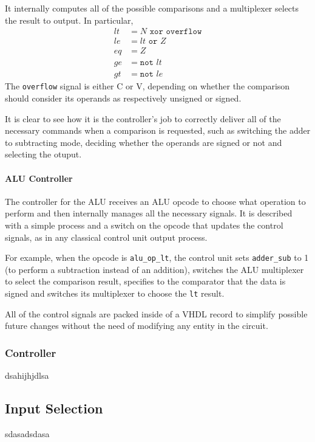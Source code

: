 It internally computes all of the possible comparisons and a multiplexer selects the result to output. In particular,
\begin{align*}
    lt &= N \texttt{ xor } \texttt{overflow} \\
    le &= lt \texttt{ or } Z \\
    eq &= Z \\
    ge &= \texttt{not } lt \\
    gt &= \texttt{not } le
\end{align*}
The \texttt{overflow} signal is either C or V, depending on whether the comparison should consider its operands as
respectively unsigned or signed.

It is clear to see how it is the controller's job to correctly deliver all of the necessary commands when a comparison
is requested, such as switching the adder to subtracting mode, deciding whether the operands are signed or not and
selecting the otuput.

\paragraph{ALU Controller}
The controller for the ALU receives an ALU opcode to choose what operation to perform and then internally manages all
the necessary signals. It is described with a simple process and a switch on the opcode that updates the control
signals, as in any classical control unit output process.

For example, when the opcode is \texttt{alu\_op\_lt}, the control unit sets \texttt{adder\_sub} to 1 (to perform a
subtraction instead of an addition), switches the ALU multiplexer to select the comparison result, specifies to the
comparator that the data is signed and switches its multiplexer to choose the \texttt{lt} result.

All of the control signals are packed inside of a VHDL record to simplify possible future changes without the need of
modifying any entity in the circuit.
\subsubsection{Controller}
dsahijhjdlsa

\subsection{Input Selection}
sdasadsdasa
